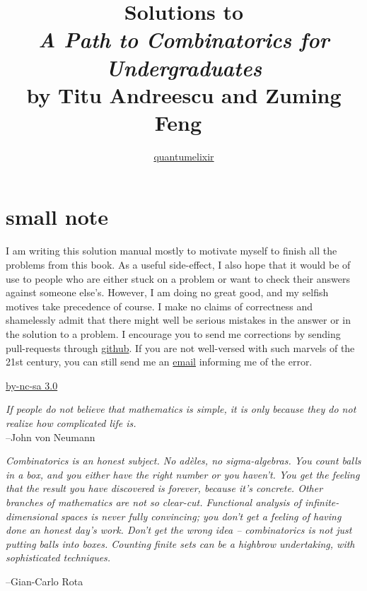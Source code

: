 \documentclass{book}
\begin{document}
\title{Solutions to \\
\emph{A Path to Combinatorics for Undergraduates} \\
by Titu Andreescu and Zuming Feng~\cite{andreescu2004path}}
\author{\href{http://profiles.google.com/quantumelixir}{quantumelixir}}
\maketitle

\chapter*{small note}
I am writing this solution manual mostly to motivate myself to finish
all the problems from this book. As a useful side-effect, I also hope
that it would be of use to people who are either stuck on a problem or
want to check their answers against someone else's. However, I am doing
no great good, and my selfish motives take precedence of course. I make
no claims of correctness and shamelessly admit that there might well be
serious mistakes in the answer or in the solution to a problem. I
encourage you to send me corrections by sending pull-requests through
\href{http://github.com/quantumelixir/path-to-combinatorics}{github}.
If you are not well-versed with such marvels of the 21st century, you
can still send me an \href{mailto:quantumelixir@gmail.com}{email}
informing me of the error.

\vspace*{\fill}
\begin{center}
\href{http://creativecommons.org/licenses/by-nc-sa/3.0/}{by-nc-sa 3.0}
\end{center}

\newpage
\vspace*{\fill}
\begin{flushright}
\emph{If people do not believe that mathematics is simple, it is only
because they do not realize how complicated life is.}\\
--John von Neumann
\end{flushright}

\tableofcontents

\vspace*{\fill}
\emph{Combinatorics is an honest subject. No ad\`eles, no sigma-algebras.
You count balls in a box, and you either have the right number or you
haven't. You get the feeling that the result you have discovered is
forever, because it’s concrete. Other branches of mathematics are not so
clear-cut. Functional analysis of infinite-dimensional spaces is never
fully convincing; you don't get a feeling of having done an honest day's
work. Don't get the wrong idea – combinatorics is not just putting balls
into boxes. Counting finite sets can be a highbrow undertaking, with
sophisticated techniques.}\\
\begin{flushright}
--Gian-Carlo Rota
\end{flushright}
\vspace*{\fill}
\end{document}
